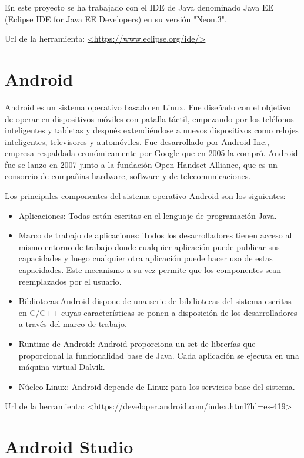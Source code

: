 En este proyecto se ha trabajado con el IDE de Java denominado Java EE (Eclipse IDE for Java EE Developers) en su versión "Neon.3".

Url de la herramienta: \url{<https://www.eclipse.org/ide/>}

\section{Android}

Android es un sistema operativo basado en Linux. Fue diseñado con el objetivo de operar en dispositivos móviles con patalla táctil, empezando por los teléfonos inteligentes y tabletas y después extendiéndose a nuevos dispositivos como relojes inteligentes, televisores y automóviles. Fue desarrollado por Android Inc., empresa respaldada económicamente por Google que en 2005 la compró. Android fue se lanzo en 2007 junto a la fundación Open Handset Alliance, que es un consorcio de compañias hardware, software y de telecomunicaciones.

Los principales componentes del sistema operativo Android son los siguientes:

\begin{itemize}
	\item{Aplicaciones}: Todas están escritas en el lenguaje de programación Java.
	\item{Marco de trabajo de aplicaciones}: Todos los desarrolladores tienen acceso al mismo entorno de trabajo donde cualquier aplicación puede publicar sus capacidades y luego cualquier otra aplicación puede hacer uso de estas capacidades. Este mecanismo a su vez permite que los componentes sean reemplazados por el usuario.
	\item{Bibliotecas}:Android dispone de una serie de bibiliotecas del sistema escritas en C/C++ cuyas características se ponen a disposición de los desarrolladores a través del marco de trabajo.
	\item{Runtime de Android}: Android proporciona un set de librerías que proporcional la funcionalidad base de Java. Cada aplicación se ejecuta en una máquina virtual Dalvik.
	\item{Núcleo Linux}: Android depende de Linux para los servicios base del sistema.
\end{itemize}
\cite{wiki:android}

Url de la herramienta: \url{<https://developer.android.com/index.html?hl=es-419>}

\section{Android Studio}

